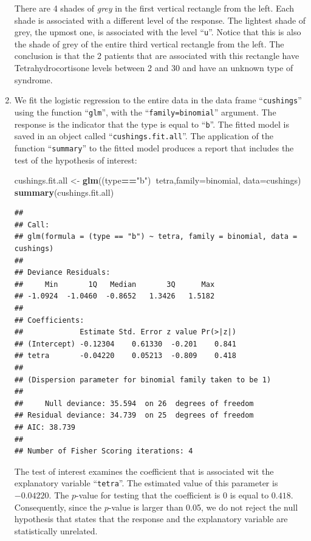 \documentclass[
]{krantz}
\makeatletter
\newenvironment{Shaded}{\begin{snugshade}}{\end{snugshade}}
\newcommand{\DataTypeTok}[1]{\textcolor[rgb]{0.13,0.29,0.53}{#1}}
\newcommand{\KeywordTok}[1]{\textcolor[rgb]{0.13,0.29,0.53}{\textbf{#1}}}
\newcommand{\NormalTok}[1]{#1}
\newcommand{\OperatorTok}[1]{\textcolor[rgb]{0.81,0.36,0.00}{\textbf{#1}}}
\newcommand{\StringTok}[1]{\textcolor[rgb]{0.31,0.60,0.02}{#1}}
\newenvironment{kframe}{%
\medskip{}
\setlength{\fboxsep}{.8em}
 \def\at@end@of@kframe{}%
 \ifinner\ifhmode%
  \def\at@end@of@kframe{\end{minipage}}%
  \begin{minipage}{\columnwidth}%
 \fi\fi%
 \def\FrameCommand##1{\hskip\@totalleftmargin \hskip-\fboxsep
 \colorbox{shadecolor}{##1}\hskip-\fboxsep
     \hskip-\linewidth \hskip-\@totalleftmargin \hskip\columnwidth}%
 \MakeFramed {\advance\hsize-\width
   \@totalleftmargin\z@ \linewidth\hsize
   \@setminipage}}%
 {\par\unskip\endMakeFramed%
 \at@end@of@kframe}
\renewenvironment{Shaded}{\begin{kframe}}{\end{kframe}}
\theoremstyle{definition}
\theoremstyle{definition}
\theoremstyle{definition}
\theoremstyle{remark}
\makeatother
\begin{document}
\begin{enumerate}
  There are 4 shades of \emph{grey} in the first vertical rectangle from the
  left. Each shade is associated with a different level of the response.
  The lightest shade of grey, the upmost one, is associated with the level
  ``\texttt{u}''. Notice that this is also the shade of grey of the entire third
  vertical rectangle from the left. The conclusion is that the 2 patients
  that are associated with this rectangle have Tetrahydrocortisone levels
  between 2 and 30 and have an unknown type of syndrome.
\item
  We fit the logistic regression to
  the entire data in the data frame ``\texttt{cushings}'' using the function
  ``\texttt{glm}'', with the ``\texttt{family=binomial}'' argument. The response is the
  indicator that the type is equal to ``\texttt{b}''. The fitted model is saved in
  an object called ``\texttt{cushings.fit.all}''. The application of the function
  ``\texttt{summary}'' to the fitted model produces a report that includes the test
  of the hypothesis of interest:

\begin{Shaded}
\begin{Highlighting}[]
\NormalTok{cushings.fit.all <-}\StringTok{ }\KeywordTok{glm}\NormalTok{((type}\OperatorTok{==}\StringTok{"b"}\NormalTok{)}\OperatorTok{~}\NormalTok{tetra,}\DataTypeTok{family=}\NormalTok{binomial, }\DataTypeTok{data=}\NormalTok{cushings)}
\KeywordTok{summary}\NormalTok{(cushings.fit.all)}
\end{Highlighting}
\end{Shaded}

\begin{verbatim}
## 
## Call:
## glm(formula = (type == "b") ~ tetra, family = binomial, data = cushings)
## 
## Deviance Residuals: 
##     Min       1Q   Median       3Q      Max  
## -1.0924  -1.0460  -0.8652   1.3426   1.5182  
## 
## Coefficients:
##             Estimate Std. Error z value Pr(>|z|)
## (Intercept) -0.12304    0.61330  -0.201    0.841
## tetra       -0.04220    0.05213  -0.809    0.418
## 
## (Dispersion parameter for binomial family taken to be 1)
## 
##     Null deviance: 35.594  on 26  degrees of freedom
## Residual deviance: 34.739  on 25  degrees of freedom
## AIC: 38.739
## 
## Number of Fisher Scoring iterations: 4
\end{verbatim}

  The test of interest examines the coefficient that is associated wit the
  explanatory variable ``\texttt{tetra}''. The estimated value of this parameter is
  \(-0.04220\). The \(p\)-value for testing that the coefficient is 0 is equal
  to \(0.418\). Consequently, since the \(p\)-value is larger than 0.05, we do
  not reject the null hypothesis that states that the response and the
  explanatory variable are statistically unrelated.


\end{enumerate}
\end{document}
